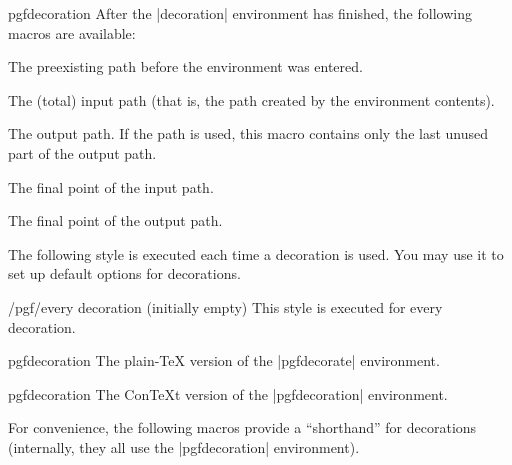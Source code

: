 \begin{environment}{{pgfdecoration}}
    After the |{decoration}| environment has finished, the following macros are
    available:

    \begin{command}{\pgfdecorateexistingpath}
        The preexisting path before the environment was entered.
    \end{command}

    \begin{command}{\pgfdecoratedpath}
        The (total) input path (that is, the path created by the environment
        contents).
    \end{command}

    \begin{command}{\pgfdecorationpath}
        The output path. If the path is used, this macro contains only the last
        unused part of the output path.
    \end{command}

    \begin{command}{\pgfpointdecoratedpathlast}
        The final point of the input path.
    \end{command}

    \begin{command}{\pgfpointdecorationpathlast}
        The final point of the output path.
    \end{command}

    The following style is executed each time a decoration is used. You may use
    it to set up default options for decorations.
    \begin{stylekey}{/pgf/every decoration (initially \normalfont empty)}
        This style is executed for every decoration.
    \end{stylekey}
\end{environment}

\begin{plainenvironment}{{pgfdecoration}}
    The plain-\TeX{} version of the |{pgfdecorate}| environment.
\end{plainenvironment}

\begin{contextenvironment}{{pgfdecoration}}
    The Con\TeX t version of the |{pgfdecoration}| environment.
\end{contextenvironment}

For convenience, the following macros provide a ``shorthand'' for decorations
(internally, they all use the |{pgfdecoration}| environment).

